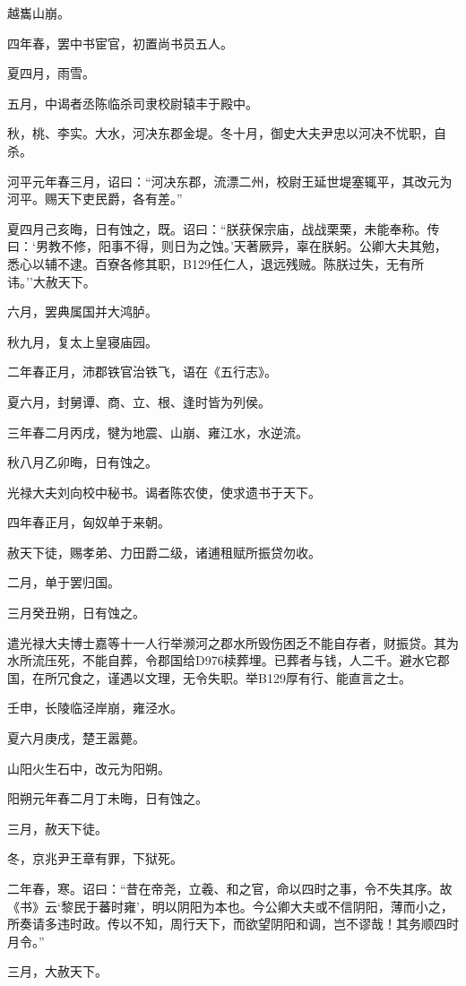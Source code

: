 \documentclass[]{article}
\begin{document}
越巂山崩。

四年春，罢中书宦官，初置尚书员五人。

夏四月，雨雪。

五月，中谒者丞陈临杀司隶校尉辕丰于殿中。

秋，桃、李实。大水，河决东郡金堤。冬十月，御史大夫尹忠以河决不忧职，自杀。

河平元年春三月，诏曰：``河决东郡，流漂二州，校尉王延世堤塞辄平，其改元为河平。赐天下吏民爵，各有差。''

夏四月己亥晦，日有蚀之，既。诏曰：``朕获保宗庙，战战栗栗，未能奉称。传曰：`男教不修，阳事不得，则日为之蚀。'天著厥异，辜在朕躬。公卿大夫其勉，悉心以辅不逮。百寮各修其职，B129任仁人，退远残贼。陈朕过失，无有所讳。''大赦天下。

六月，罢典属国并大鸿胪。

秋九月，复太上皇寝庙园。

二年春正月，沛郡铁官治铁飞，语在《五行志》。

夏六月，封舅谭、商、立、根、逢时皆为列侯。

三年春二月丙戌，犍为地震、山崩、雍江水，水逆流。

秋八月乙卯晦，日有蚀之。

光禄大夫刘向校中秘书。谒者陈农使，使求遗书于天下。

四年春正月，匈奴单于来朝。

赦天下徒，赐孝弟、力田爵二级，诸逋租赋所振贷勿收。

二月，单于罢归国。

三月癸丑朔，日有蚀之。

遣光禄大夫博士嘉等十一人行举濒河之郡水所毁伤困乏不能自存者，财振贷。其为水所流压死，不能自葬，令郡国给D976椟葬埋。已葬者与钱，人二千。避水它郡国，在所冗食之，谨遇以文理，无令失职。举B129厚有行、能直言之士。

壬申，长陵临泾岸崩，雍泾水。

夏六月庚戌，楚王嚣薨。

山阳火生石中，改元为阳朔。

阳朔元年春二月丁未晦，日有蚀之。

三月，赦天下徒。

冬，京兆尹王章有罪，下狱死。

二年春，寒。诏曰：``昔在帝尧，立羲、和之官，命以四时之事，令不失其序。故《书》云`黎民于蕃时雍'，明以阴阳为本也。今公卿大夫或不信阴阳，薄而小之，所奏请多违时政。传以不知，周行天下，而欲望阴阳和调，岂不谬哉！其务顺四时月令。''

三月，大赦天下。
\end{document}
